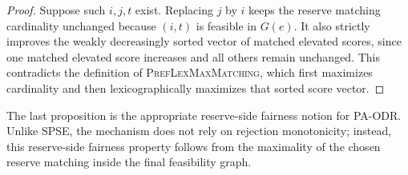 \documentclass[runningheads]{llncs}
\newcommand{\1}{\mathbf{1}}
\begin{document}
\begin{proof}
Suppose such $i,j,t$ exist. Replacing $j$ by $i$ keeps the reserve matching cardinality unchanged because $(i,t)$ is feasible in $G(e)$. It also strictly improves the weakly decreasingly sorted vector of matched elevated scores, since one matched elevated score increases and all others remain unchanged. This contradicts the definition of \textsc{PrefLexMaxMatching}, which first maximizes cardinality and then lexicographically maximizes that sorted score vector.
\end{proof}

The last proposition is the appropriate reserve-side fairness notion for PA-ODR. Unlike SPSE, the mechanism does not rely on rejection monotonicity; instead, this reserve-side fairness property follows from the maximality of the chosen reserve matching inside the final feasibility graph.





\end{document}
